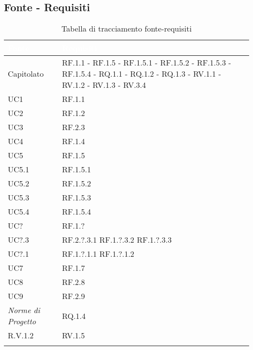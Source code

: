 \subsection{Fonte - Requisiti}
\begin{center}
  \centering
  \begin{longtable}{|C{6cm}|C{6cm}|}
    \hline
    \textcolor[HTML]{FFFFFF}{\textbf{Fonte}} & \textcolor[HTML]{FFFFFF}{\textbf{Requisiti}} \\ \hline
    Capitolato & RF.1.1 - RF.1.5 - RF.1.5.1 - RF.1.5.2 - RF.1.5.3 - RF.1.5.4 - RQ.1.1 - RQ.1.2 - RQ.1.3 - RV.1.1 - RV.1.2 - RV.1.3 - RV.3.4 \\ \hline
    UC1 & RF.1.1 \\ \hline
    UC2 & RF.1.2 \\ \hline
    UC3 & RF.2.3 \\ \hline
    UC4 & RF.1.4 \\ \hline
    UC5 & RF.1.5 \\ \hline
    UC5.1 & RF.1.5.1 \\ \hline
    UC5.2 & RF.1.5.2 \\ \hline
    UC5.3 & RF.1.5.3 \\ \hline
    UC5.4 & RF.1.5.4 \\ \hline
    UC? & RF.1.? \\ \hline
    UC?.3 & RF.2.?.3.1 RF.1.?.3.2 RF.1.?.3.3  \\ \hline
    UC?.1 & RF.1.?.1.1 RF.1.?.1.2 \\ \hline
    UC7 & RF.1.7 \\ \hline
    UC8 & RF.2.8 \\ \hline
    UC9 & RF.2.9 \\ \hline
    \textit{Norme di Progetto} & RQ.1.4 \\ \hline
    R.V.1.2 & RV.1.5 \\ \hline

    \caption{Tabella di tracciamento fonte-requisiti}
  \end{longtable}
\end{center}

